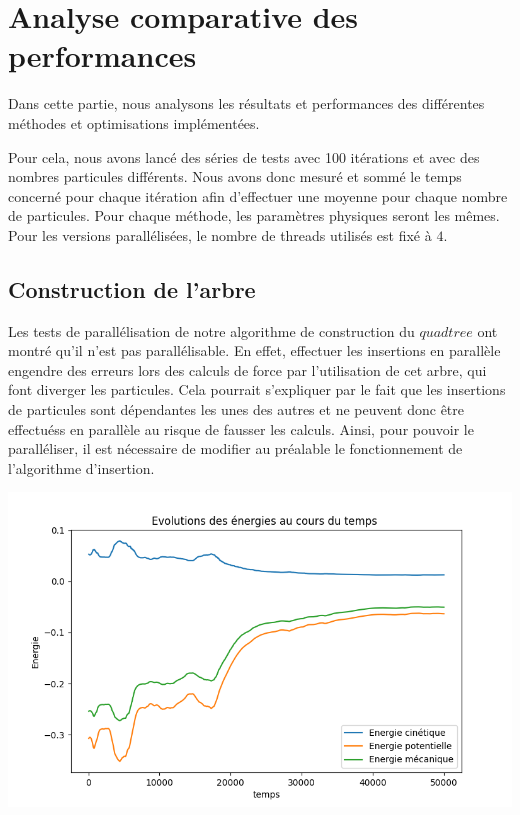 \chapter{Analyse comparative des  performances}
Dans cette partie, nous analysons les résultats et performances des différentes méthodes et optimisations implémentées.

Pour cela, nous avons lancé des séries de tests avec 100 itérations et avec des nombres particules différents. Nous avons donc mesuré et sommé le temps concerné pour chaque itération afin d'effectuer une moyenne pour chaque nombre de particules. Pour chaque méthode, les paramètres physiques seront les mêmes. Pour les versions parallélisées, le nombre de threads utilisés est fixé à $4$.

\section{Construction de l'arbre}

Les tests de parallélisation de notre algorithme de construction du $quadtree$ ont montré qu'il n'est pas parallélisable. En effet,  effectuer les insertions en parallèle engendre des erreurs lors  des calculs de force par l'utilisation de cet arbre, qui font diverger les particules. Cela pourrait s'expliquer par le fait que les insertions de particules sont dépendantes les unes des autres et ne peuvent donc être effectuéss en parallèle au risque de fausser les calculs. Ainsi, pour pouvoir le paralléliser, il est nécessaire de modifier au préalable le fonctionnement de l'algorithme d'insertion.

\begin{center}
\includegraphics[scale=0.6]{./resultats/Energy_tree.png}
\captionsetup{hypcap=false}
\label{fig11}
\end{center}

